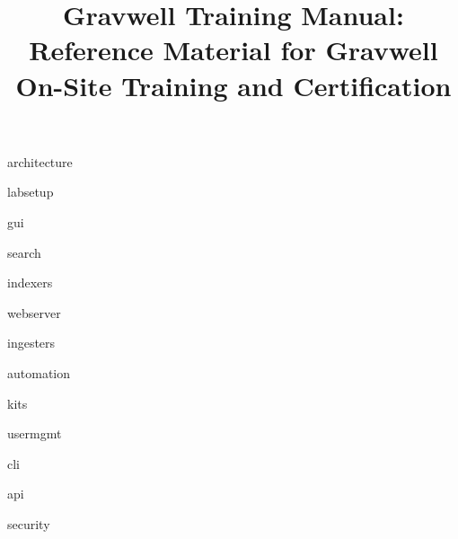 \documentclass[]{report}
\date{}
\newcommand{\titlepicture}[2][]{%
  \renewcommand\placetitlepicture{%
    \texttt{[image: \#2]}\par\medskip
  }%
}
\newcommand{\placetitlepicture}{} %
\begin{document}
\titlepicture{img/logo.png}
\title{Gravwell Training Manual: Reference Material for Gravwell On-Site Training and Certification}
\maketitle

\newpage

\tableofcontents
\newpage




{architecture}

{labsetup}

{gui}

{search}

{indexers}

{webserver}

{ingesters}

{automation}

{kits}

{usermgmt}

{cli}

{api}

{security}


\printindex
\end{document}
